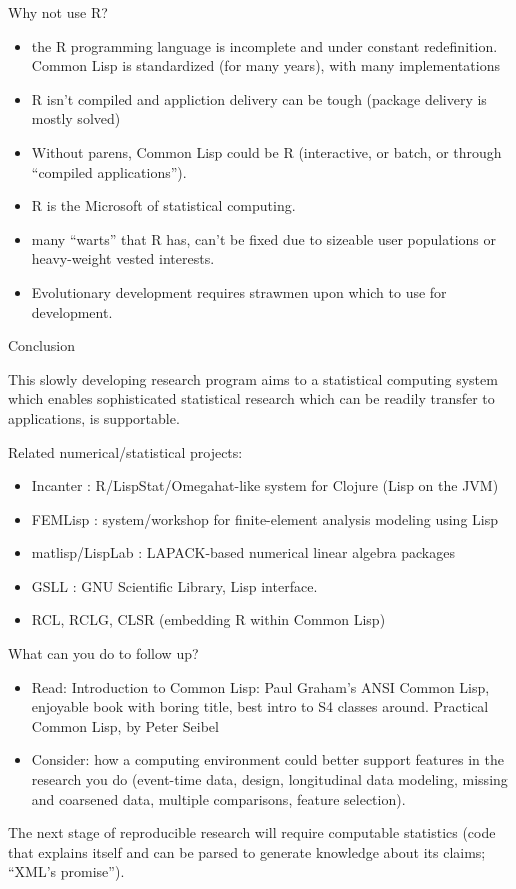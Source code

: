 \documentclass{beamer}
\begin{document}
\begin{frame}{Why not use R?}
  \begin{itemize}
  \item the R programming language is incomplete and under constant
    redefinition.  Common Lisp is standardized (for many years), with
    many implementations
  \item R isn't compiled and appliction delivery can be tough (package
    delivery is mostly solved)
  \item Without parens, Common Lisp could be R (interactive, or batch,
    or through ``compiled applications'').
  \item R is the Microsoft of statistical computing.
  \item many ``warts'' that R has, can't be fixed due to sizeable user
    populations or heavy-weight vested interests.
  \item Evolutionary development requires strawmen upon which to use
    for development.
\end{itemize}

\end{frame}

\begin{frame}{Conclusion}

  This slowly developing research program aims to a statistical
  computing system which enables sophisticated statistical research
  which can be readily transfer to applications, is supportable.

  Related numerical/statistical projects:
  \begin{itemize}
  \item Incanter : R/LispStat/Omegahat-like system for Clojure (Lisp
    on the JVM)
  \item FEMLisp : system/workshop for finite-element analysis modeling
    using Lisp
  \item matlisp/LispLab : LAPACK-based numerical linear algebra packages
  \item GSLL : GNU Scientific Library, Lisp interface.
  \item RCL, RCLG, CLSR (embedding R within Common Lisp)
  \end{itemize}
\end{frame}

\begin{frame}{What can you do to follow up?}

  \begin{itemize}
  \item Read:  Introduction to Common Lisp: Paul Graham's ANSI Common Lisp,
    enjoyable book with boring title, best intro to S4 classes
    around.  Practical Common Lisp, by Peter Seibel
  \item Consider:  how a computing environment could better support
    features in the research you do (event-time data, design,
    longitudinal data modeling, missing and coarsened data, multiple
    comparisons, feature selection). 
  \end{itemize}
  The next stage of reproducible research will require computable
  statistics (code that explains itself and can be parsed to generate
  knowledge about its claims; ``XML's promise'').
\end{frame}
\end{document}

